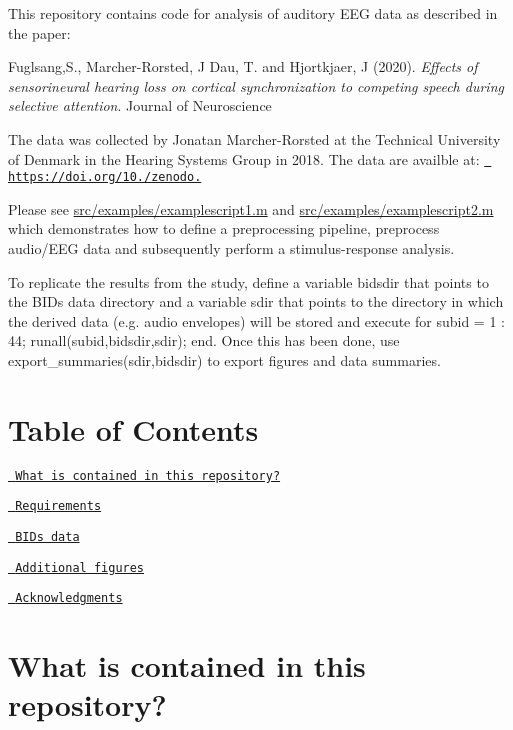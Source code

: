 This repository contains code for analysis of auditory E\+EG data as described in the paper\+:

Fuglsang,S., Marcher-\/\+Rorsted, J Dau, T. and Hjortkjaer, J (2020). {\itshape Effects of sensorineural hearing loss on cortical synchronization to competing speech during selective attention}. Journal of Neuroscience

The data was collected by Jonatan Marcher-\/\+Rorsted at the Technical University of Denmark in the Hearing Systems Group in 2018. The data are availble at\+: \href{https://doi.org/10.5072/zenodo.463871}{\texttt{ https\+://doi.\+org/10./zenodo.}}

Please see {\ttfamily \mbox{\hyperlink{examplescript1_8m}{src/examples/examplescript1.\+m}}} and {\ttfamily \mbox{\hyperlink{examplescript2_8m}{src/examples/examplescript2.\+m}}} which demonstrates how to define a preprocessing pipeline, preprocess audio/\+E\+EG data and subsequently perform a stimulus-\/response analysis.

To replicate the results from the study, define a variable {\ttfamily bidsdir} that points to the B\+I\+Ds data directory and a variable {\ttfamily sdir} that points to the directory in which the derived data (e.\+g. audio envelopes) will be stored and execute {\ttfamily for subid = 1 \+: 44; runall(subid,bidsdir,sdir); end}. Once this has been done, use {\ttfamily export\+\_\+summaries(sdir,bidsdir)} to export figures and data summaries.

\section*{Table of Contents}


\begin{DoxyItemize}
\item \href{\#Repo}{\texttt{ What is contained in this repository?}}
\item \href{\#Requirements}{\texttt{ Requirements}}
\item \href{\#BIDS}{\texttt{ B\+I\+Ds data}}
\item \href{\#addfigure}{\texttt{ Additional figures}}
\item \href{\#ack}{\texttt{ Acknowledgments}}
\end{DoxyItemize}

\section*{\label{_Repo}%
What is contained in this repository?}

